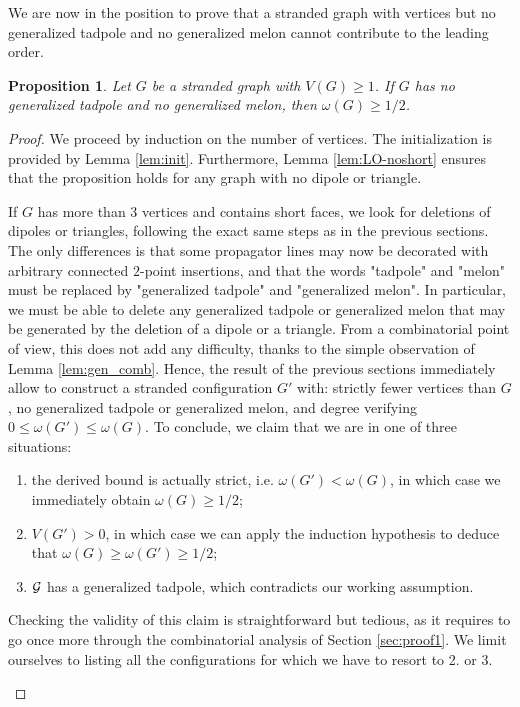 \documentclass[10pt]{article}
\theoremstyle{plain}
\newtheorem{proposition}{Proposition}
\theoremstyle{definition}
\newcommand{\cG}{{\cal G}}
\begin{document}
We are now in the position to prove that a stranded graph with vertices but no generalized tadpole and no generalized melon cannot contribute to the leading order.
\begin{proposition}\label{prop:LO-bound}
Let $G$ be a stranded graph with $V(G) \geq 1$. If $G$ has no generalized tadpole and no generalized melon, then $\omega(G) \geq 1/2$.
\end{proposition} 
\begin{proof}
We proceed by induction on the number of vertices. The initialization is provided by Lemma \ref{lem:init}. Furthermore, Lemma \ref{lem:LO-noshort} ensures that the proposition holds for any graph with no dipole or triangle.

If $G$ has more than $3$ vertices and contains short faces, we look for deletions of dipoles or triangles, following the exact same steps as in the previous sections. The only differences is that some propagator lines may now be decorated with arbitrary connected $2$-point insertions, and that the words "tadpole" and "melon" must be replaced by "generalized tadpole" and "generalized melon". In particular, we must be able to delete any generalized tadpole or generalized melon that may be generated by the deletion of a dipole or a triangle. From a combinatorial point of view, this does not add any difficulty, thanks to the simple observation of Lemma \ref{lem:gen_comb}. Hence, the result of the previous sections immediately allow to construct a stranded configuration $G'$ with: strictly fewer vertices than $G$, no generalized tadpole or generalized melon, and degree verifying $0 \leq \omega(G') \leq \omega(G)$. To conclude, we claim that we are in one of three situations:
\begin{enumerate}
\item the derived bound is actually strict, i.e. $\omega(G')< \omega(G)$, in which case we immediately obtain $\omega(G) \geq 1/2$;
\item $V(G')>0$, in which case we can apply the induction hypothesis to deduce that $\omega(G) \geq \omega(G') \geq 1/2$;
\item $\cG$ has a generalized tadpole, which contradicts our working assumption. 
\end{enumerate}
Checking the validity of this claim is straightforward but tedious, as it requires to go once more through the combinatorial analysis of Section \ref{sec:proof1}. We limit ourselves to listing all the configurations for which we have to resort to 2. or 3.
\begin{itemize}


\end{itemize}
\end{proof}
\end{document}
